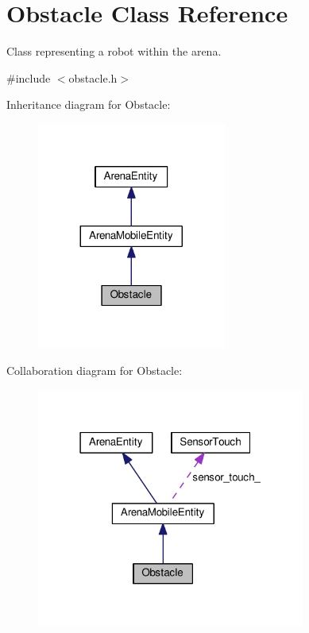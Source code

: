 \hypertarget{classObstacle}{}\section{Obstacle Class Reference}
\label{classObstacle}


Class representing a robot within the arena.  




{\ttfamily \#include $<$obstacle.\+h$>$}



Inheritance diagram for Obstacle\+:\nopagebreak
\begin{figure}[H]
\begin{center}
\leavevmode
\includegraphics[width=176pt]{classObstacle__inherit__graph}
\end{center}
\end{figure}


Collaboration diagram for Obstacle\+:\nopagebreak
\begin{figure}[H]
\begin{center}
\leavevmode
\includegraphics[width=250pt]{classObstacle__coll__graph}
\end{center}
\end{figure}
